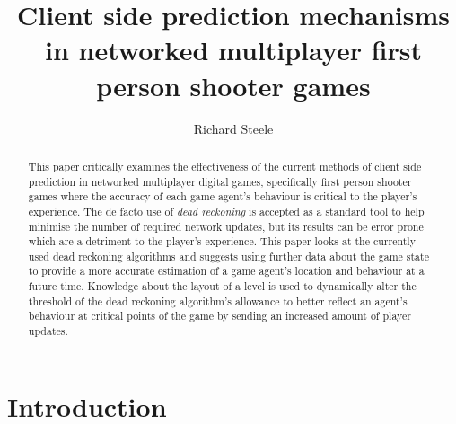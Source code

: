 \documentclass[journal]{IEEEtran}
\begin{document}
%
\title{Client side prediction mechanisms in networked multiplayer first person shooter games}
%
%
\author{Richard Steele}


\maketitle

\begin{abstract}
This paper critically examines the effectiveness of the current methods of client side prediction in networked multiplayer digital games, specifically first person shooter games where the accuracy of each game agent's behaviour is critical to the player's experience. The de facto use of \textit{dead reckoning} is accepted as a standard tool to help minimise the number of required network updates, but its results can be error prone which are a detriment to the player's experience. This paper looks at the currently used dead reckoning algorithms and suggests using further data about the game state to provide a more accurate estimation of a game agent's location and behaviour at a future time. Knowledge about the layout of a level is used to dynamically alter the threshold of the dead reckoning algorithm's allowance to better reflect an agent's behaviour at critical points of the game by sending an increased amount of player updates.
\end{abstract}

\section{Introduction}
% 
% 
% 
% 
\end{document}
